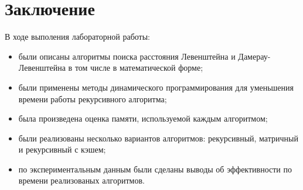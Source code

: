 \chapter*{Заключение}

В ходе выполения лабораторной работы:

\begin{itemize}[left=\parindent]
    \item были описаны алгоритмы поиска расстояния Левенштейна и
          Дамерау-Левенштейна в том числе в математической форме;
    \item были применены методы динамического программирования для уменьшения
          времени работы рекурсивного алгоритма;
    \item была произведена оценка памяти, используемой каждым алгоритмом;
    \item были реализованы несколько вариантов алгоритмов: рекурсивный,
          матричный и рекурсивный с кэшем;
    \item по экспериментальным данным были сделаны выводы об эффективности по
          времени реализованых алгоритмов.
\end{itemize}
